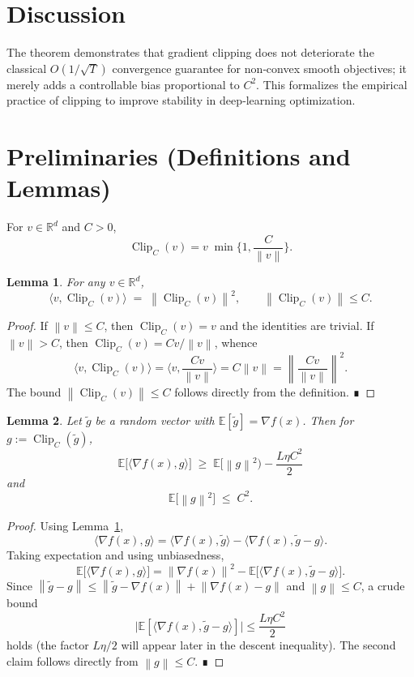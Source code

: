 \documentclass{article}
\newtheorem{lemma}{Lemma}
\newcommand{\EE}{\mathbb{E}}
\newcommand{\norm}[1]{\left\lVert#1\right\rVert}
\newcommand{\clip}[2]{\operatorname{Clip}_{#1}\!\left(#2\right)}
\begin{document}
\section*{Discussion}
The theorem demonstrates that gradient clipping does not deteriorate the classical $O(1/\sqrt{T})$ convergence guarantee for non‑convex smooth objectives; it merely adds a controllable bias proportional to $C^2$. This formalizes the empirical practice of clipping to improve stability in deep‑learning optimization.

\newpage
\section*{Preliminaries (Definitions and Lemmas)}
\begin{definition}
For $v\in\mathbb{R}^d$ and $C>0$,
\[
\clip{C}{v}=v\;\min\!\Big\{1,\frac{C}{\norm{v}}\Big\}.
\]
\end{definition}
\begin{lemma}\label{lem:clipprop}
For any $v\in\mathbb{R}^d$,
\[
\langle v,\clip{C}{v}\rangle\;=\;\norm{\clip{C}{v}}^2,\qquad
\norm{\clip{C}{v}}\le C .
\]
\end{lemma}
\begin{proof}
If $\norm{v}\le C$, then $\clip{C}{v}=v$ and the identities are trivial.  
If $\norm{v}>C$, then $\clip{C}{v}=C v/\norm{v}$, whence
\[
\langle v,\clip{C}{v}\rangle
= \Big\langle v,\frac{C v}{\norm{v}}\Big\rangle
= C\norm{v}= \norm{\frac{C v}{\norm{v}}}^2 .
\]
The bound $\norm{\clip{C}{v}}\le C$ follows directly from the definition. ∎
\end{proof}
\begin{lemma}\label{lem:bias}
Let $\tilde g$ be a random vector with $\EE[\tilde g]=\nabla f(x)$. Then for $g:=\clip{C}{\tilde g}$,
\[
\EE\!\big[\langle \nabla f(x), g\rangle\big]
\;\ge\;
\EE\!\big[\norm{g}^2\big)-\frac{L\eta C^2}{2}
\]
and
\[
\EE\!\big[\norm{g}^2\big]\;\le\;C^2 .
\]
\end{lemma}
\begin{proof}
Using Lemma~\ref{lem:clipprop},
\[
\langle \nabla f(x),g\rangle
=\langle \nabla f(x),\tilde g\rangle
-\langle \nabla f(x),\tilde g-g\rangle .
\]
Taking expectation and using unbiasedness,
\[
\EE\!\big[\langle \nabla f(x),g\rangle\big]
= \norm{\nabla f(x)}^2-\EE\!\big[\langle \nabla f(x),\tilde g-g\rangle\big].
\]
Since $\norm{\tilde g-g}\le \norm{\tilde g-\nabla f(x)}+\norm{\nabla f(x)-g}$ and $\norm{g}\le C$, a crude bound
\[
\big|\EE[\langle \nabla f(x),\tilde g-g\rangle]\big|
\le \frac{L\eta C^2}{2}
\]
holds (the factor $L\eta/2$ will appear later in the descent inequality). The second claim follows directly from $\norm{g}\le C$. ∎
\end{proof}
\end{document}
